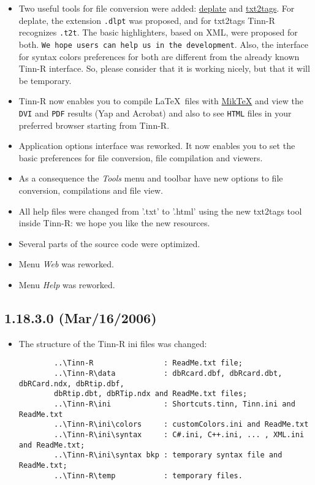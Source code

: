 \begin{itemize}
  \item Two useful tools for file conversion were added:
    \href{http://deplate.sourceforge.net/index.php}{deplate}
    and
    \href{http://txt2tags.sourceforge.net}{txt2tags}.
    For deplate, the extension \texttt{.dlpt} was proposed, and for txt2tags
    Tinn-R recognizes \texttt{.t2t}. The basic highlighters, based on XML,
    were proposed for both. \texttt{We hope users can help us in the
      development}. Also, the interface for syntax colors preferences for
    both are different from the already known Tinn-R interface. So, please
    consider that it is working nicely, but that it will be temporary.
  \item Tinn-R now enables you to compile \LaTeX ~files with
    \href{http://www.miktex.org}{MikTeX} and view the
    \texttt{DVI} and \texttt{PDF} results (Yap and Acrobat) and also
    to see \texttt{HTML} files in your preferred browser starting from
    Tinn-R.
  \item Application options interface was reworked. It now enables you
    to set the basic preferences for file conversion, file compilation
    and viewers.
  \item As a consequence the \textit{Tools} menu and toolbar have new
    options to file conversion, compilations and file view.
  \item All help files were changed from '.txt' to '.html' using the
    new txt2tags tool inside Tinn-R: we hope you like the new resources.
  \item Several parts of the source code were optimized.
  \item Menu \textit{Web} was reworked.
  \item Menu \textit{Help} was reworked.
\end{itemize}


\subsection*{1.18.3.0 (Mar/16/2006)}
\begin{itemize}
  \item The structure of the Tinn-R ini files was changed:

    \begin{footnotesize}
      \begin{verbatim}
        ..\Tinn-R                : ReadMe.txt file;
        ..\Tinn-R\data           : dbRcard.dbf, dbRcard.dbt, dbRCard.ndx, dbRtip.dbf,
        dbRtip.dbt, dbRTip.ndx and ReadMe.txt files;
        ..\Tinn-R\ini            : Shortcuts.tinn, Tinn.ini and ReadMe.txt
        ..\Tinn-R\ini\colors     : customColors.ini and ReadMe.txt
        ..\Tinn-R\ini\syntax     : C#.ini, C++.ini, ... , XML.ini and ReadMe.txt;
        ..\Tinn-R\ini\syntax bkp : temporary syntax file and ReadMe.txt;
        ..\Tinn-R\temp           : temporary files.
      \end{verbatim}
    \end{footnotesize}

\end{itemize}

